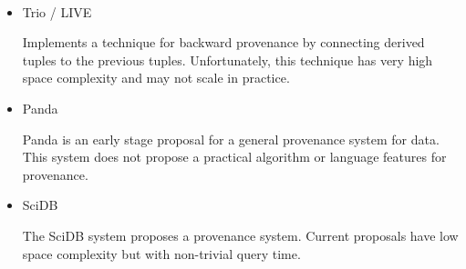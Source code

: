 
~\cite{buneman00}

\cite{simmhan05asurvey} 

\cite{simmhan_survey} 

\cite{glavic_dataprovenance}

\cite{queryprov_sig2010}

\cite{chapman_provstorage}

\cite{plt_stanford}

\begin{itemize}
\item Trio / LIVE \cite{widom2005trio, sarma2010live} 
  
Implements a technique for backward provenance by connecting derived tuples to the previous tuples. Unfortunately, this technique has very high space complexity and may not scale in practice. 

\item Panda \cite{ikeda2010panda} 

Panda is an early stage proposal for a general provenance system for data. This system does not propose a practical algorithm or language features for provenance. 

\item SciDB \cite{cudré2009demonstration}

The SciDB system proposes a provenance system. Current proposals have low space complexity but with non-trivial query time. 

\end{itemize}
